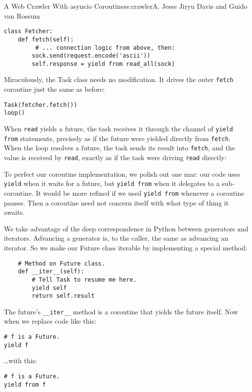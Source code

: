 \begin{aosachapter}{A Web Crawler With asyncio Coroutines}{s:crawler}{A. Jesse Jiryu Davis and Guido van Rossum}
\begin{verbatim}
class Fetcher:
    def fetch(self):
         # ... connection logic from above, then:
        sock.send(request.encode('ascii'))
        self.response = yield from read_all(sock)
\end{verbatim}

Miraculously, the Task class needs no modification. It drives the outer
\texttt{fetch} coroutine just the same as before:

\begin{verbatim}
Task(fetcher.fetch())
loop()
\end{verbatim}

When \texttt{read} yields a future, the task receives it through the
channel of \texttt{yield from} statements, precisely as if the future
were yielded directly from \texttt{fetch}. When the loop resolves a
future, the task sends its result into \texttt{fetch}, and the value is
received by \texttt{read}, exactly as if the task were driving
\texttt{read} directly:


To perfect our coroutine implementation, we polish out one mar: our code
uses \texttt{yield} when it waits for a future, but \texttt{yield from}
when it delegates to a sub-coroutine. It would be more refined if we
used \texttt{yield from} whenever a coroutine pauses. Then a coroutine
need not concern itself with what type of thing it awaits.

We take advantage of the deep correspondence in Python between
generators and iterators. Advancing a generator is, to the caller, the
same as advancing an iterator. So we make our Future class iterable by
implementing a special method:

\begin{verbatim}
    # Method on Future class.
    def __iter__(self):
        # Tell Task to resume me here.
        yield self
        return self.result
\end{verbatim}

The future's \texttt{\_\_iter\_\_} method is a coroutine that yields the
future itself. Now when we replace code like this:

\begin{verbatim}
# f is a Future.
yield f
\end{verbatim}

\ldots{}with this:

\begin{verbatim}
# f is a Future.
yield from f
\end{verbatim}


\end{aosachapter}
